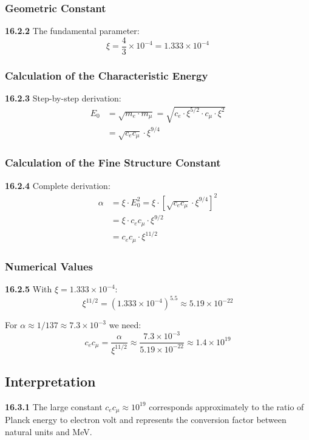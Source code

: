 \documentclass[12pt,a4paper]{article}
\newcommand{\xipar}{\xi}
\begin{document}
\subsubsection{Geometric Constant}
\noindent \textbf{16.2.2} The fundamental parameter:
\begin{equation}
	\xipar = \frac{4}{3} \times 10^{-4} = 1.333 \times 10^{-4}
\end{equation}

\subsubsection{Calculation of the Characteristic Energy}
\noindent \textbf{16.2.3} Step-by-step derivation:
\begin{align}
	E_0 &= \sqrt{m_e \cdot m_\mu} = \sqrt{c_e \cdot \xipar^{5/2} \cdot c_\mu \cdot \xipar^2} \\
	&= \sqrt{c_e c_\mu} \cdot \xipar^{9/4}
\end{align}

\subsubsection{Calculation of the Fine Structure Constant}
\noindent \textbf{16.2.4} Complete derivation:
\begin{align}
	\alpha &= \xipar \cdot E_0^2 = \xipar \cdot \left[ \sqrt{c_e c_\mu} \cdot \xipar^{9/4} \right]^2 \\
	&= \xipar \cdot c_e c_\mu \cdot \xipar^{9/2} \\
	&= c_e c_\mu \cdot \xipar^{11/2}
\end{align}

\subsubsection{Numerical Values}
\noindent \textbf{16.2.5} With $\xipar = 1.333 \times 10^{-4}$:
\begin{equation}
	\xipar^{11/2} = (1.333 \times 10^{-4})^{5.5} \approx 5.19 \times 10^{-22}
\end{equation}

For $\alpha \approx 1/137 \approx 7.3 \times 10^{-3}$ we need:
\begin{equation}
	c_e c_\mu = \frac{\alpha}{\xipar^{11/2}} \approx \frac{7.3 \times 10^{-3}}{5.19 \times 10^{-22}} \approx 1.4 \times 10^{19}
\end{equation}

\subsection{Interpretation}
\noindent \textbf{16.3.1} The large constant $c_e c_\mu \approx 10^{19}$ corresponds approximately to the ratio of Planck energy to electron volt and represents the conversion factor between natural units and MeV.
\end{document}
